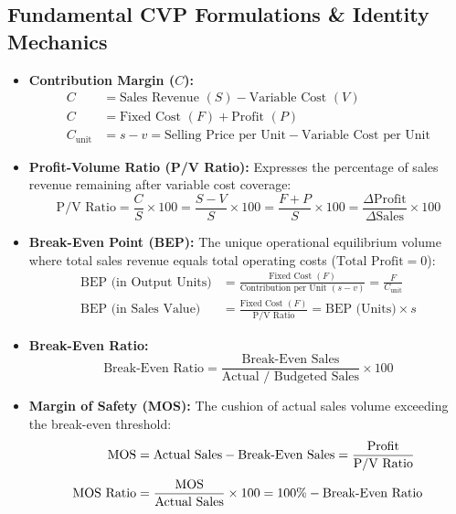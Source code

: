 \subsection{Fundamental CVP Formulations \& Identity Mechanics}
\begin{formulabox}
\begin{itemize}[leftmargin=*, noitemsep]
    \item \textbf{Contribution Margin ($C$):}
    \begin{align}
        C &= \text{Sales Revenue } (S) - \text{Variable Cost } (V) \\[2pt]
        C &= \text{Fixed Cost } (F) + \text{Profit } (P) \\[2pt]
        C_{\text{unit}} &= s - v = \text{Selling Price per Unit} - \text{Variable Cost per Unit}
    \end{align}

    \item \textbf{Profit-Volume Ratio (P/V Ratio):}
    Expresses the percentage of sales revenue remaining after variable cost coverage:
    \begin{equation}
        \text{P/V Ratio} = \frac{C}{S} \times 100 = \frac{S - V}{S} \times 100 = \frac{F + P}{S} \times 100 = \frac{\Delta \text{Profit}}{\Delta \text{Sales}} \times 100
    \end{equation}

    \item \textbf{Break-Even Point (BEP):}
    The unique operational equilibrium volume where total sales revenue equals total operating costs ($\text{Total Profit} = 0$):
    \begin{align}
        \text{BEP (in Output Units)} &= \frac{\text{Fixed Cost } (F)}{\text{Contribution per Unit } (s - v)} = \frac{F}{C_{\text{unit}}} \\[4pt]
        \text{BEP (in Sales Value)} &= \frac{\text{Fixed Cost } (F)}{\text{P/V Ratio}} = \text{BEP (Units)} \times s
    \end{align}

    \item \textbf{Break-Even Ratio:}
    \begin{equation}
        \text{Break-Even Ratio} = \frac{\text{Break-Even Sales}}{\text{Actual / Budgeted Sales}} \times 100
    \end{equation}

    \item \textbf{Margin of Safety (MOS):}
    The cushion of actual sales volume exceeding the break-even threshold:
    \begin{align}
        \operatorname{MOS} &= \text{Actual Sales} - \text{Break-Even Sales} = \frac{\text{Profit}}{\text{P/V Ratio}} \\[3pt]
        \text{MOS Ratio} &= \frac{\operatorname{MOS}}{\text{Actual Sales}} \times 100 = 100\% - \text{Break-Even Ratio}
    \end{align}


\end{itemize}
\end{formulabox}
